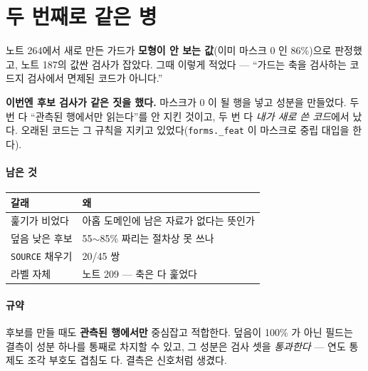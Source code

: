 \documentclass[10pt]{article}
\begin{document}
\section{두 번째로 같은 병}

노트 264에서 새로 만든 가드가 \textbf{모형이 안 보는 값}(이미 마스크 0 인
86\%)으로 판정했고, 노트 187의 값싼 검사가 잡았다. 그때 이렇게 적었다 ---
``가드는 축을 검사하는 코드지 검사에서 면제된 코드가 아니다.''

\textbf{이번엔 후보 검사가 같은 짓을 했다.} 마스크가 0 이 될 행을 넣고
성분을 만들었다. 두 번 다 ``관측된 행에서만 읽는다''를 안 지킨 것이고,
두 번 다 \emph{내가 새로 쓴 코드}에서 났다. 오래된 코드는 그 규칙을 지키고
있었다(\texttt{forms.\_feat} 이 마스크로 중립 대입을 한다).

\paragraph{남은 것}
\begin{center}\small
\begin{tabular}{ll}
\hline
갈래 & 왜 \\
\hline
훑기가 비었다 & 아홉 도메인에 남은 자료가 없다는 뜻인가 \\
덮음 낮은 후보 & 55$\sim$85\% 짜리는 절차상 못 쓰나 \\
\texttt{SOURCE} 채우기 & 20/45 쌍 \\
라벨 자체 & 노트 209 --- 축은 다 훑었다 \\
\hline
\end{tabular}
\end{center}

\paragraph{규약} 후보를 만들 때도 \textbf{관측된 행에서만} 중심잡고 적합한다.
덮음이 100\% 가 아닌 필드는 결측이 성분 하나를 통째로 차지할 수 있고, 그
성분은 검사 셋을 \emph{통과한다} --- 연도 통제도 조각 부호도 겹침도 다.
결측은 신호처럼 생겼다.
\end{document}
